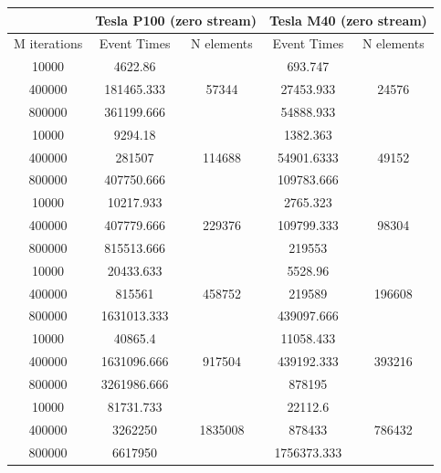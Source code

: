 \begin{table}	
	\centering
	\begin{tabular}{ | c ||  c | c  || c | c | } 
		\hline
		&  \multicolumn{2}{c}{\textbf{Tesla P100 (zero stream)}} & \multicolumn{2}{c}{\textbf{Tesla M40 (zero stream)}}\\ [0.5ex]
		\hline\hline
		M iterations & Event Times & N elements    &    Event Times & N elements  \\
		\hline
		
		
		10000 &	4622.86 &	\multirow{3}{*}{57344}&	693.747&	\multirow{3}{*}{24576}\\
		400000 & 181465.333&	&	27453.933&	\\
		800000 &	361199.666&	&	54888.933&	\\
		\hline
		10000 &	9294.18&	\multirow{3}{*}{114688}&	1382.363&	\multirow{3}{*}{49152}\\
		400000 &	281507 &	&	54901.6333&	\\
		800000 &	407750.666&	&	109783.666&	\\
		\hline
		10000 &	10217.933&	\multirow{3}{*}{229376}&	2765.323&	\multirow{3}{*}{98304}\\
		400000 &	407779.666&	&	109799.333&	\\
		800000 &	815513.666&	&	219553&	\\
		\hline
		10000 &	20433.633&	\multirow{3}{*}{458752}&	5528.96&	\multirow{3}{*}{196608}\\
		400000 &	815561&	&	219589&	\\
		800000 &	1631013.333&	&	439097.666&	\\
		\hline
		10000 &	40865.4&	\multirow{3}{*}{917504}&	11058.433&	\multirow{3}{*}{393216}\\
		400000 &	1631096.666&	&	439192.333&	\\
		800000 &	3261986.666&	&	878195&	\\
		\hline
		10000 &	81731.733&	\multirow{3}{*}{1835008}&	22112.6&	\multirow{3}{*}{786432}\\
		400000 &	3262250	& &	878433&	\\
		800000 &	6617950 &	&	1756373.333&	\\

\end{tabular}
\end{table}
